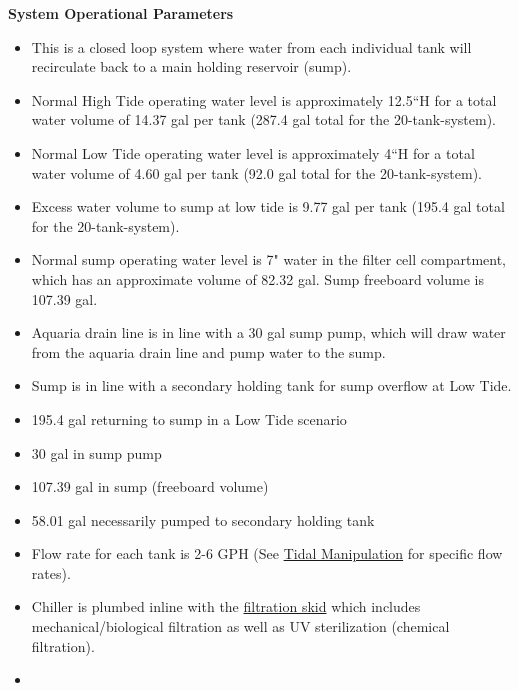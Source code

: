 \documentclass[]{book}
\providecommand{\tightlist}{%
  \setlength{\itemsep}{0pt}\setlength{\parskip}{0pt}}
\begin{document}
 \textbf{System Operational Parameters}

\begin{itemize}
\tightlist
\item
  This is a closed loop system where water from each individual tank
  will recirculate back to a main holding reservoir (sump).\\
\item
  Normal High Tide operating water level is approximately 12.5``H for a
  total water volume of 14.37 gal per tank (287.4 gal total for the
  20-tank-system).\\
\item
  Normal Low Tide operating water level is approximately 4``H for a
  total water volume of 4.60 gal per tank (92.0 gal total for the
  20-tank-system).\\
\item
  Excess water volume to sump at low tide is 9.77 gal per tank (195.4
  gal total for the 20-tank-system).\\
\item
  Normal sump operating water level is 7" water in the filter cell
  compartment, which has an approximate volume of 82.32 gal. Sump
  freeboard volume is 107.39 gal.\\
\item
  Aquaria drain line is in line with a 30 gal sump pump, which will draw
  water from the aquaria drain line and pump water to the sump.\\
\item
  Sump is in line with a secondary holding tank for sump overflow at Low
  Tide.
\item
  195.4 gal returning to sump in a Low Tide scenario
\item
  30 gal in sump pump
\item
  107.39 gal in sump (freeboard volume)
\item
  58.01 gal necessarily pumped to secondary holding tank
\item
  Flow rate for each tank is 2-6 GPH (See
  \href{chapters/06-tidal_manipulation.md}{Tidal Manipulation} for
  specific flow rates).\\
\item
  Chiller is plumbed inline with the
  \href{https://github.com/SilbigerLab/Mesocosm_User_Manual/blob/master/Manuals/Filtration_Skid_Build_Package.pdf}{filtration
  skid} which includes mechanical/biological filtration as well as UV
  sterilization (chemical filtration).\\
\item

\end{itemize}
\end{document}
